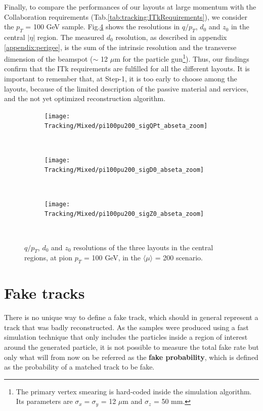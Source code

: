 \documentclass[a4paper,twoside,12pt]{book}
\begin{document}
Finally, to compare the performances of our layouts at large momentum with the Collaboration requirements (Tab.\ref{tab:tracking:ITkRequirements}), we consider the $p_{T}$ = 100 GeV sample.
Fig.\ref{fig:tracking:pt100resolutions_zoom} shows the resolutions in $q/p_{T}$, $d_{0}$ and $z_{0}$ in the central
$|\eta|$ region. The measured $d_{0}$ resolution, as described in appendix \ref{appendix:perigee}, is the sum of the intrinsic resolution and the transverse dimension of the beamspot ($\sim$ 12 $\mu$m for the particle gun\footnote{The primary vertex smearing is hard-coded inside the simulation algorithm. Its parameters are $\sigma_{x} = \sigma_{y}$ = 12 $\mu$m and $\sigma_{z}$ = 50 mm.}). Thus, our findings confirm that the ITk requirements are fulfilled for all the different layouts. It is important to remember that, at Step-1, it is too early to choose among the
layouts, because of the limited description of the passive material and services, and the not yet optimized reconstruction algorithm. \\



\begin{figure}
\begin{subfigure}{\linewidth}
\centering
\texttt{[image: Tracking/Mixed/pi100pu200\_sigQPt\_abseta\_zoom]}
\caption{}
\label{fig:tracking:pi100pu200_sigQPt_abseta_zoom}
\end{subfigure}\\[1ex]
\begin{subfigure}{\linewidth}
\centering
\texttt{[image: Tracking/Mixed/pi100pu200\_sigD0\_abseta\_zoom]}
\caption{}
\label{fig:tracking:pi100pu200_sigD0_abseta_zoom}
\end{subfigure}\\[1ex]
\begin{subfigure}{\linewidth}
\centering
\texttt{[image: Tracking/Mixed/pi100pu200\_sigZ0\_abseta\_zoom]}
\caption{}
\label{fig:tracking:pi100pu200_sigZ0_abseta_zoom}
\end{subfigure}\\[1ex]
\caption{$q/p_{T}$, $d_{0}$ and $z_{0}$ resolutions of the three layouts in the central regions, at pion $p_{T}$ = 100 GeV, in the $\langle\mu\rangle$ = 200 scenario.}
\label{fig:tracking:pt100resolutions_zoom}
\end{figure}


\section{Fake tracks}
There is no unique way to define a fake track, which should in general represent a track that was badly reconstructed. As the samples were produced using a fast simulation technique that
only includes the particles inside a region of interest around the generated particle, it is not possible to measure the total fake rate but only what will from now on be referred
as the \textbf{fake probability}, which is defined as the probability of a matched track to be fake. \\
\end{document}
